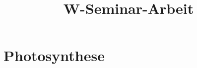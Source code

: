 \documentclass[a4paper, 11pt, ngerman]{scrreprt}
\title{W-Seminar-Arbeit}
\begin{document}
\tableofcontents

\chapter{Photosynthese}
\end{document}
